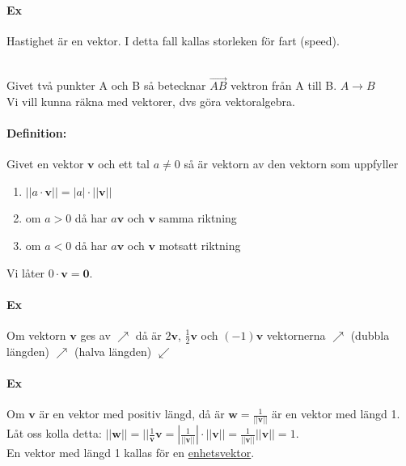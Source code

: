     \paragraph{Ex} Hastighet är en vektor. I detta fall kallas storleken för fart (speed).
    \par
    ~\\
    Givet två punkter A och B så betecknar $\overrightarrow{AB}$ vektron från A till B. $A\longrightarrow B$
    \\Vi vill kunna räkna med vektorer, dvs göra vektoralgebra.
    
    \clearpage

    \paragraph{Definition:} Givet en vektor $\bm{v}$ och ett tal $a\neq 0$ så är vektorn av den vektorn som uppfyller
    \begin{enumerate}
        \item $||a\cdot \bm{v}||=|a|\cdot ||\bm{v}||$
        \item om $a>0$ då har $a\bm{v}$ och $\bm{v}$ samma riktning
        \item om $a<0$ då har $a\bm{v}$ och $\bm{v}$ motsatt riktning
    \end{enumerate}
    Vi låter $0\cdot \bm{v} = \bm{0} $.
    
    \paragraph{Ex} Om vektorn $\bm{v}$ ges av $\nearrow $ då är $2\bm{v}$, $\frac{1}{2}\bm{v}$ och $(-1)\bm{v}$ vektornerna
    $\nearrow$ (dubbla längden) $\nearrow$ (halva längden) $\swarrow $

    \paragraph{Ex} Om $\bm{v}$ är en vektor med positiv längd, då är $\bm{w}=\frac{1}{||\bm{v}||}$ är en vektor med längd 1.
    Låt oss kolla detta: $||\bm{w}|| = ||\frac{1}{\bm{v}}\bm{v}=|\frac{1}{||\bm{v}||}|\cdot ||\bm{v}||=\frac{1}{||\bm{v}||}||\bm{v}||=1$.\\
    En vektor med längd 1 kallas för en \underline{enhetsvektor}.

